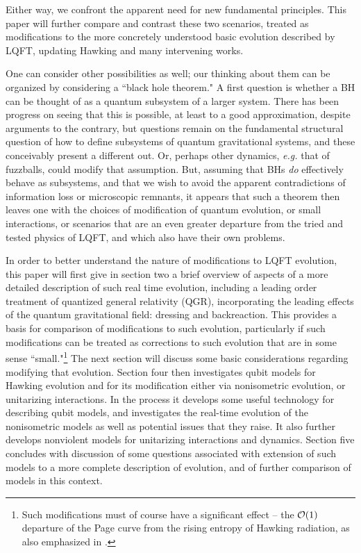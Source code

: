 \documentclass[12pt]{article}
\numberwithin{equation}{section}
\newcommand{\calo}{{\cal O}}
\begin{document}
Either way, we confront the apparent need for new fundamental principles.  This paper will further compare and contrast 
these two scenarios,  treated as modifications to the more concretely understood basic evolution described by LQFT, updating Hawking\cite{Hawk} and many intervening works.  


One can consider other possibilities as well; our thinking about them can be organized by considering a ``black hole theorem\cite{BHthm}."  A first question is whether a BH can be thought of as a quantum subsystem of a larger system.  There has been progress on seeing that this is possible, at least to a good approximation\cite{DoGi4,SGsplit,SGsub}, despite arguments to the contrary\cite{CGPR}, but questions remain on the fundamental structural question of how to define subsystems of quantum gravitational systems, and these conceivably present a different out.  Or, perhaps other dynamics, {\it e.g.} that of fuzzballs\cite{Fuzzrev}, could modify that assumption.  But, assuming that BHs {\it do} effectively behave as subsystems, and that we wish to avoid the apparent contradictions of information loss or microscopic remnants, it appears that such a theorem then leaves one with the choices of modification of quantum evolution, or small interactions, or scenarios that are an even greater departure from the tried and tested physics of LQFT, and which also have their own problems.

In order to better understand the nature of modifications to LQFT evolution, this paper will first give in section two a brief overview of aspects of a more detailed description of such real time evolution, including a leading order treatment of quantized general relativity (QGR), incorporating the leading effects of the quantum gravitational field:  dressing and backreaction.  This provides a basis for comparison of modifications to such evolution, particularly if such modifications can be treated as corrections to such evolution that are in some sense ``small."\footnote{Such modifications must of course have a significant effect -- the $\calo(1)$ departure of the Page curve\cite{Pageone,Pagetwo} from the rising entropy of Hawking radiation, as also emphasized in \cite{Mathinforev}.} The next section will discuss some basic considerations regarding modifying that evolution.  Section four then investigates qubit models for Hawking evolution and for its modification either via nonisometric evolution, or unitarizing interactions.  In the process it develops some useful technology for describing qubit models, and  investigates the real-time evolution of the nonisometric models as well as potential issues that they raise.  It also
 further develops nonviolent models for unitarizing interactions and dynamics.  Section five concludes with discussion of some questions associated with extension of such models to a more complete description of evolution, and of further comparison of models in this context.
\end{document}
